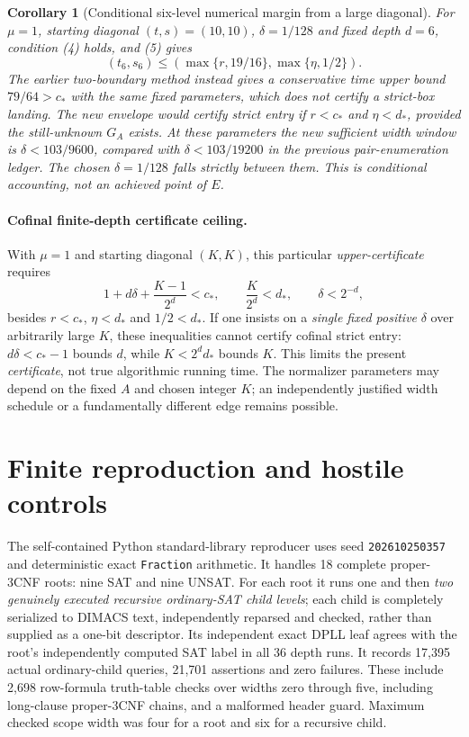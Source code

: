 \documentclass[11pt]{article}
\newtheorem{corollary}[theorem]{Corollary}
\begin{document}
\begin{corollary}[Conditional six-level numerical margin from a large diagonal]
For $\mu=1$, starting diagonal $(t,s)=(10,10)$,
$\delta=1/128$ and fixed depth $d=6$, condition (4) holds,
and (5) gives
\[
(t_6,s_6)\le
\left(\max\{r,19/16\},\max\{\eta,1/2\}\right).
\]
The earlier two-boundary method instead gives a conservative time
upper bound $79/64>c_*$ with the same fixed parameters, which
\emph{does not certify} a strict-box landing. The new envelope
would certify strict entry if $r<c_*$ and $\eta<d_*$,
\emph{provided the still-unknown $G_A$ exists}.
At these parameters the new sufficient width window is
$\delta<103/9600$, compared with $\delta<103/19200$
in the previous pair-enumeration ledger. The chosen
$\delta=1/128$ falls strictly between them. This is
conditional accounting, not an achieved point of $E$.
\end{corollary}

\paragraph{Cofinal finite-depth certificate ceiling.}
With $\mu=1$ and starting diagonal $(K,K)$, this particular
\emph{upper-certificate} requires
\[
1+d\delta+\frac{K-1}{2^d}<c_*,\qquad
\frac{K}{2^d}<d_*,\qquad \delta<2^{-d},
\]
besides $r<c_*$, $\eta<d_*$ and $1/2<d_*$.
If one insists on a \emph{single fixed positive} $\delta$ over
arbitrarily large $K$, these inequalities cannot certify cofinal
strict entry: $d\delta<c_*-1$ bounds $d$, while
$K<2^d d_*$ bounds $K$.  This limits the present
\emph{certificate}, not true algorithmic running time.
The normalizer parameters may depend on the fixed $A$ and chosen
integer $K$; an independently justified width schedule or a
fundamentally different edge remains possible.

\section{Finite reproduction and hostile controls}
The self-contained Python standard-library reproducer uses seed
\texttt{202610250357} and deterministic exact \texttt{Fraction} arithmetic.
It handles 18 complete proper-3CNF roots: nine SAT and nine UNSAT.
For each root it runs one and then \emph{two genuinely executed recursive
ordinary-SAT child levels}; each child is completely serialized to
DIMACS text, independently reparsed and checked, rather than supplied
as a one-bit descriptor. Its independent exact DPLL leaf agrees with
the root's independently computed SAT label in all 36 depth runs.
It records 17,395 actual ordinary-child queries, 21,701 assertions and
zero failures. These include 2,698 row-formula truth-table checks over
widths zero through five, including long-clause proper-3CNF
chains, and a malformed header guard.  Maximum checked scope width
was four for a root and six for a recursive child.
\end{document}
